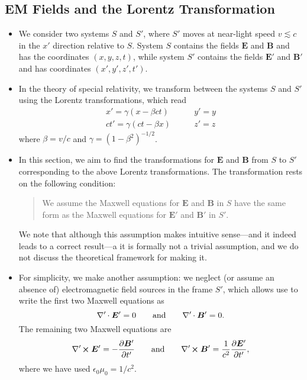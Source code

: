 \documentclass[11pt, a4paper]{article}
\newcommand{\eqtext}[1]{\qquad \text{#1} \qquad}
\renewcommand{\vec}[1]{\bm{#1}} %
\newcommand{\E}{\vec{E}} %
\newcommand{\B}{\vec{B}} %
\newcommand{\ee}{\epsilon_{0}}  %
\newcommand{\mm}{\mu_{0}}  %
\newcommand{\divp}{\nabla' \mspace{-1mu} \cdot}  %
\newcommand{\curlp}{\nabla' \mspace{-2mu} \cross}
\begin{document}
\subsection{EM Fields and the Lorentz Transformation}
\begin{itemize}
	\item We consider two systems $ S $ and $ S' $, where $ S' $  moves at near-light speed $ v \lesssim c $ in the $ x' $ direction relative to $ S $. System $ S $ contains the fields $ \E $ and $ \B $ and has the coordinates $ (x, y, z, t) $, while system $ S' $ contains the fields $ \E' $ and $ \B' $ and has coordinates $ (x', y', z', t') $.
	
	\item In the theory of special relativity, we transform between the systems $ S $ and $ S' $ using the Lorentz transformations, which read
    \begin{equation*}
        \begin{array}{cc}
            x' = \gamma(x - \beta ct) & \qquad y' = y \\
            ct' = \gamma(ct - \beta x) & \qquad z' = z
        \end{array}
    \end{equation*}
    where $ \beta = v/c $ and $ \gamma = \left( 1 - \beta^{2} \right)^{-1/2} $.
	
	\item In this section, we aim to find the transformations for $ \E $ and $ \B $ from $ S $ to $ S' $ corresponding to the above Lorentz transformations. The transformation rests on the following condition:
    \begin{quote}
        We assume the Maxwell equations for $ \E $ and $ \B $ in $ S $ have the same form as the Maxwell equations for $ \E' $ and $ \B' $ in $ S' $.
    \end{quote}
    We note that although this assumption makes intuitive sense---and it indeed leads to a correct result---a it is formally not a trivial assumption, and we do not discuss the theoretical framework for making it.
	
    \item For simplicity, we make another assumption: we neglect (or assume an absence of) electromagnetic field sources in the frame $ S' $, which allows use to write the first two Maxwell equations as
    \begin{equation*}
        \divp \E' = 0 \qquad \text{and} \qquad \divp \B' = 0.
    \end{equation*}
    The remaining two Maxwell equations are
	\begin{equation*}
		\curlp \E' = - \pdv{\B'}{t'}  \eqtext{and} \curlp \B' = \frac{1}{c^{2}}\pdv{\E'}{t'},
	\end{equation*}
    where we have used $ \ee \mm = 1 / c^{2} $. 


\end{itemize}
\end{document}
